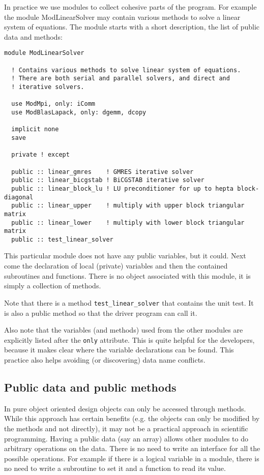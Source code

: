 \documentclass{article}
\begin{document}
In practice we use modules to collect cohesive parts of the program. 
For example the module ModLinearSolver may contain various methods to 
solve a linear system of equations. The module starts with a short 
description, the list of public data and methods:
\begin{verbatim}
module ModLinearSolver

  ! Contains various methods to solve linear system of equations.
  ! There are both serial and parallel solvers, and direct and 
  ! iterative solvers.

  use ModMpi, only: iComm
  use ModBlasLapack, only: dgemm, dcopy

  implicit none
  save

  private ! except

  public :: linear_gmres    ! GMRES iterative solver
  public :: linear_bicgstab ! BiCGSTAB iterative solver
  public :: linear_block_lu ! LU preconditioner for up to hepta block-diagonal 
  public :: linear_upper    ! multiply with upper block triangular matrix
  public :: linear_lower    ! multiply with lower block triangular matrix
  public :: test_linear_solver
\end{verbatim}
This particular module does not have any public variables, but it could.
Next come the declaration of local (private) variables and then the 
contained subroutines and functions. There is no object associated with
this module, it is simply a collection of methods. 

Note that there is a method {\tt test\_linear\_solver} that contains the
unit test. It is also a public method so that the driver program can call it.

Also note that the variables (and methods) used from the other modules are 
explicitly listed after the {\tt only} attribute. 
This is quite helpful for the developers, because it makes clear where 
the variable declarations can be found. This practice also helps avoiding 
(or discovering) data name conflicts.

\subsection{Public data and public methods}

In pure object oriented design objects can only be accessed through methods.
While this approach has certain benefits (e.g. the objects can only be modified
by the methods and not directly), it may not be a practical approach in 
scientific programming. Having a public data (say an array) allows other
modules to do arbitrary operations on the data. There is no need to write
an interface for all the possible operations. For example if there is a logical
variable in a module, there is no need to write a subroutine to set it and
a function to read its value. 
\end{document}
